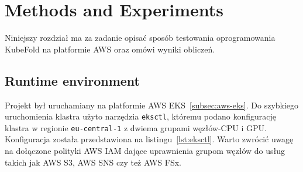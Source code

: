 
\chapter{Methods and Experiments}

Niniejszy rozdział ma za zadanie opisać sposób testowania oprogramowania KubeFold na platformie AWS oraz omówi wyniki obliczeń.


\section{Runtime environment}

Projekt był uruchamiany na platformie AWS EKS~\ref{subsec:aws-eks}.
Do szybkiego uruchomienia klastra użyto narzędzia \texttt{eksctl}, któremu podano konfigurację klastra w regionie \texttt{eu-central-1} z dwiema grupami węzłów-CPU i GPU.
Konfiguracja została przedstawiona na listingu~\ref{lst:eksctl}.
Warto zwrócić uwagę na dołączone polityki AWS IAM dające uprawnienia grupom węzłów do usług takich jak AWS S3, AWS SNS czy też AWS FSx.

